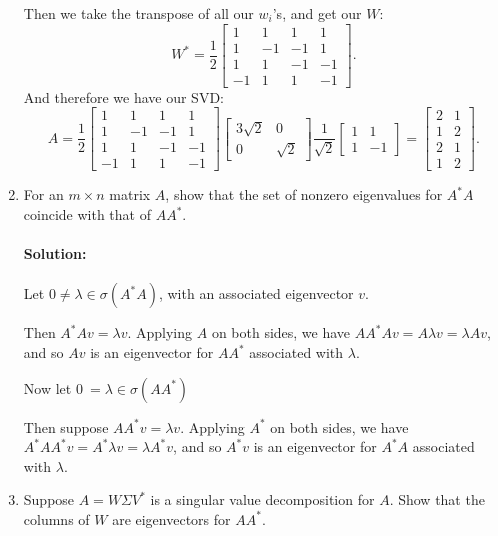 \documentclass{article}
\begin{document}
\begin{enumerate}
    Then we take the transpose of all our $w_i$'s, and get our $W$:
    \[
    W^* =\frac{1}{2}
    \begin{bmatrix} 1&1&1&1\\
    1&-1&-1&1\\
    1&1&-1&-1\\
    -1&1&1&-1
    \end{bmatrix}
    .\] 
    And therefore we have our SVD:
     \[
    A=\frac{1}{2}
    \begin{bmatrix} 1&1&1&1\\
    1&-1&-1&1\\
    1&1&-1&-1\\
    -1&1&1&-1
\end{bmatrix}
\begin{bmatrix} 3\sqrt{2} &0\\0&\sqrt{2}  \end{bmatrix} 
\frac{1}{\sqrt{2} }\begin{bmatrix} 1&1\\1&-1 \end{bmatrix} 
=\begin{bmatrix} 2&1\\1&2\\2&1\\1&2\end{bmatrix}
    .\] 

    \newpage
\item For an $m \times  n$ matrix $A$, show that the set of nonzero eigenvalues for $A^*  A$ coincide with that of $AA^* $.
    \paragraph{Solution: }Let $0\neq \lambda\in \sigma(A^* A)$, with an associated eigenvector $v$.

    Then $A^* Av=\lambda v$. Applying $A$ on both sides, we have $A A^*  Av=A\lambda v=\lambda Av$, and so $Av$ is an eigenvector for $A A^* $ associated with $\lambda$.

    Now let $0~=\lambda\in \sigma(A A^* )$

    Then suppose $A A^*v=\lambda v$. Applying $A^* $ on both sides, we have $A ^*A  A^* v=A^* \lambda v=\lambda A^* v$, and so $A^*v$ is an eigenvector for $A ^*A$ associated with $\lambda$.

\item Suppose $A = W \Sigma V^* $ is a singular value decomposition for $A$. Show that the columns of $W$ are eigenvectors for $AA^* $.

\end{enumerate}
\end{document}
